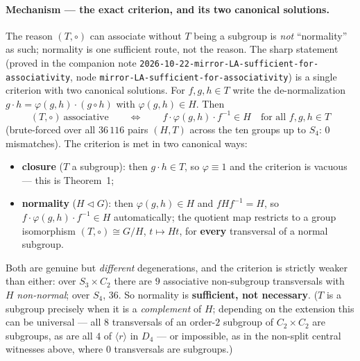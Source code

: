 \documentclass[11pt]{article}
\theoremstyle{plain}
\theoremstyle{definition}
\theoremstyle{remark}
\begin{document}
\paragraph{Mechanism --- the exact criterion, and its two canonical solutions.} The reason
$(T,\circ)$ can associate without $T$ being a subgroup is \emph{not} ``normality'' as such;
normality is one sufficient route, not the reason. The sharp statement (proved in the companion
note \texttt{2026-10-22-mirror-LA-sufficient-for-associativity}, node
\texttt{mirror-LA-sufficient-for-associativity}) is a single criterion with two canonical
solutions. For $f, g, h \in T$ write the de-normalization $g\cdot h = \varphi(g,h)\cdot(g\circ h)$
with $\varphi(g,h)\in H$. Then
\[
  (T,\circ)\ \text{associative}\qquad\Longleftrightarrow\qquad
  f\cdot\varphi(g,h)\cdot f^{-1}\in H\quad\text{for all } f,g,h\in T
\]
(brute-forced over all $36\,116$ pairs $(H,T)$ across the ten groups up to $S_4$: $0$ mismatches).
The criterion is met in two canonical ways:
\begin{itemize}[leftmargin=1.6em]
\item \textbf{closure} ($T$ a subgroup): then $g\cdot h\in T$, so $\varphi\equiv 1$ and the
  criterion is vacuous --- this is Theorem~1;
\item \textbf{normality} ($H\triangleleft G$): then $\varphi(g,h)\in H$ and $fHf^{-1}=H$, so
  $f\cdot\varphi(g,h)\cdot f^{-1}\in H$ automatically; the quotient map restricts to a group
  isomorphism $(T,\circ)\cong G/H$, $t\mapsto Ht$, for \textbf{every} transversal of a normal
  subgroup.
\end{itemize}
Both are genuine but \emph{different} degenerations, and the criterion is strictly weaker than
either: over $S_3\times C_2$ there are $9$ associative non-subgroup transversals with $H$
\emph{non-normal}; over $S_4$, $36$. So normality is \textbf{sufficient, not necessary}. ($T$ is a
subgroup precisely when it is a \emph{complement} of $H$; depending on the extension this can be
universal --- all $8$ transversals of an order-$2$ subgroup of $C_2\times C_2$ are subgroups, as are
all $4$ of $\langle r\rangle$ in $D_4$ --- or impossible, as in the non-split central witnesses
above, where $0$ transversals are subgroups.)
\end{document}
